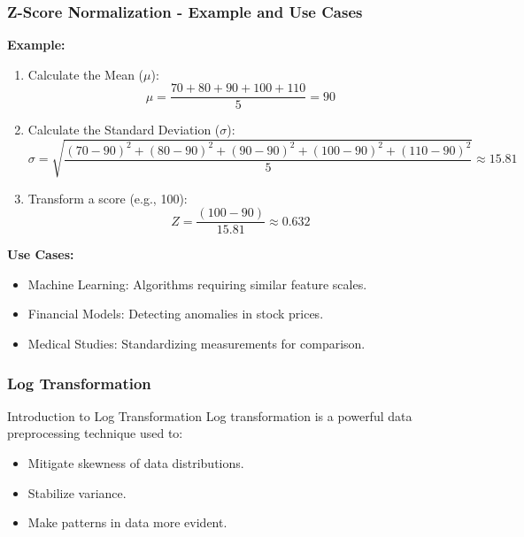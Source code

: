 \documentclass[aspectratio=169]{beamer}
\begin{document}
\begin{frame}[fragile]
    \frametitle{Z-Score Normalization - Example and Use Cases}
    \textbf{Example:}
    \begin{enumerate}
        \item Calculate the Mean (\( \mu \)):
            \[
            \mu = \frac{70 + 80 + 90 + 100 + 110}{5} = 90
            \]
        \item Calculate the Standard Deviation (\( \sigma \)):
            \[
            \sigma = \sqrt{\frac{(70 - 90)^2 + (80 - 90)^2 + (90 - 90)^2 + (100 - 90)^2 + (110 - 90)^2}{5}} \approx 15.81
            \]
        \item Transform a score (e.g., 100):
            \[
            Z = \frac{(100 - 90)}{15.81} \approx 0.632
            \]
    \end{enumerate}

    \textbf{Use Cases:}
    \begin{itemize}
        \item Machine Learning: Algorithms requiring similar feature scales.
        \item Financial Models: Detecting anomalies in stock prices.
        \item Medical Studies: Standardizing measurements for comparison.
    \end{itemize}
\end{frame}

\begin{frame}[fragile]
  \frametitle{Log Transformation}
  \begin{block}{Introduction to Log Transformation}
    Log transformation is a powerful data preprocessing technique used to:
    \begin{itemize}
      \item Mitigate skewness of data distributions.
      \item Stabilize variance.
      \item Make patterns in data more evident.
    \end{itemize}
  \end{block}
\end{frame}
\end{document}
